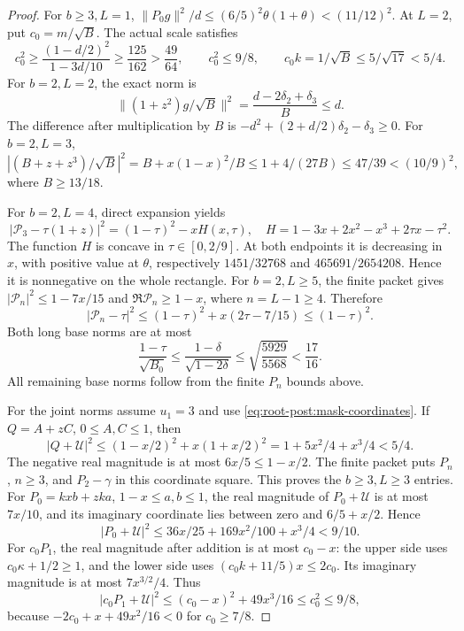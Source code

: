 \begin{proof}
For \(b\ge3,L=1\),
\(\|P_0g\|^2/d\le(6/5)^2\theta(1+\theta)<(11/12)^2\).
At \(L=2\), put \(c_0=m/\sqrt B\).
The actual scale satisfies
\[
 c_0^2\ge\frac{(1-d/2)^2}{1-3d/10}
 \ge\frac{125}{162}>\frac{49}{64},\qquad
 c_0^2\le9/8,\qquad c_0k=1/\sqrt B\le5/\sqrt {17}<5/4.
\]
For \(b=2,L=2\), the exact norm is
\[
 \|(1+z^2)g/\sqrt B\|^2
 =\frac{d-2\delta_2+\delta_3}{B}\le d.
\]
The difference after multiplication by \(B\) is
\(-d^2+(2+d/2)\delta_2-\delta_3\ge0\).
For \(b=2,L=3\),
\[
 |(B+z+z^3)/\sqrt B|^2
 =B+x(1-x)^2/B\le1+4/(27B)\le47/39<(10/9)^2,
\]
where \(B\ge13/18\).

For \(b=2,L=4\), direct expansion yields
\[
 |\mathcal P_3-\tau(1+z)|^2
 =(1-\tau)^2-xH(x,\tau),\quad
 H=1-3x+2x^2-x^3+2\tau x-\tau^2.
\]
The function \(H\) is concave in \(\tau\in[0,2/9]\).
At both endpoints it is decreasing in \(x\), with positive value at
\(\theta\), respectively \(1451/32768\) and \(465691/2654208\).
Hence it is nonnegative on the whole rectangle.
For \(b=2,L\ge5\), the finite packet gives
\(|\mathcal P_n|^2\le1-7x/15\) and \(\Re\mathcal P_n\ge1-x\),
where \(n=L-1\ge4\). Therefore
\[
 |\mathcal P_n-\tau|^2
 \le(1-\tau)^2+x(2\tau-7/15)\le(1-\tau)^2.
\]
Both long base norms are at most
\[
 \frac{1-\tau}{\sqrt {B_0}}
 \le\frac{1-\delta}{\sqrt{1-2\delta}}
 \le\sqrt{\frac{5929}{5568}}<\frac{17}{16}.
\]
All remaining base norms follow from the finite \(P_n\) bounds above.

For the joint norms assume \(u_1=3\) and use
\eqref{eq:root-post:mask-coordinates}.
If \(Q=A+zC\), \(0\le A,C\le1\), then
\[
 |Q+\mathcal U|^2\le
 (1-x/2)^2+x(1+x/2)^2
 =1+5x^2/4+x^3/4<5/4.
\]
The negative real magnitude is at most \(6x/5\le1-x/2\).
The finite packet puts \(P_n\), \(n\ge3\), and \(P_2-\gamma\) in
this coordinate square. This proves the \(b\ge3,L\ge3\) entries.
For \(P_0=kxb+zka\), \(1-x\le a,b\le1\), the real magnitude of
\(P_0+\mathcal U\) is at most \(7x/10\), and its imaginary
coordinate lies between zero and \(6/5+x/2\). Hence
\[
 |P_0+\mathcal U|^2
 \le36x/25+169x^2/100+x^3/4<9/10.
\]
For \(c_0P_1\), the real magnitude after addition is at most \(c_0-x\):
the upper side uses \(c_0\kappa+1/2\ge1\), and the lower side uses
\((c_0k+11/5)x\le2c_0\).
Its imaginary magnitude is at most \(7x^{3/2}/4\). Thus
\[
 |c_0P_1+\mathcal U|^2
 \le(c_0-x)^2+49x^3/16\le c_0^2\le9/8,
\]
because \(-2c_0+x+49x^2/16<0\) for \(c_0\ge7/8\).


\end{proof}
